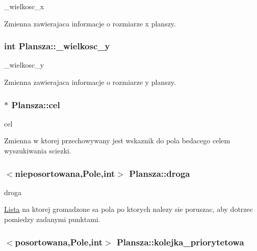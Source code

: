 \+\_\+wielkosc\+\_\+x 

Zmienna zawierajaca informacje o rozmiarze x planszy. \hypertarget{class_plansza_a8f896782ff5b9322070dc0fcc6f8efa0}{
\subsubsection[{\+\_\+wielkosc\+\_\+y}]{\setlength{\rightskip}{0pt plus 5cm}int Plansza\+::\+\_\+wielkosc\+\_\+y\hspace{0.3cm}{\ttfamily [private]}}}\label{class_plansza_a8f896782ff5b9322070dc0fcc6f8efa0}


\+\_\+wielkosc\+\_\+y 

Zmienna zawierajaca informacje o rozmiarze y planszy. \hypertarget{class_plansza_a1a2574ca93b7df2633c33194ca7bb0a7}{
\subsubsection[{cel}]{$\ast$ Plansza\+::cel}}\label{class_plansza_a1a2574ca93b7df2633c33194ca7bb0a7}


cel 

Zmienna w ktorej przechowywany jest wskaznik do pola bedacego celem wyszukiwania sciezki. \hypertarget{class_plansza_aec2526e5fde2763eb9f2447e0830c1cb}{
\subsubsection[{droga}]{$<$nieposortowana,{\bf Pole},int$>$ Plansza\+::droga\hspace{0.3cm}{\ttfamily [private]}}}\label{class_plansza_aec2526e5fde2763eb9f2447e0830c1cb}


droga 

\hyperlink{class_lista}{Lista} na ktorej gromadzone sa pola po ktorych nalezy sie poruszac, aby dotrzec pomiedzy zadanymi punktami. \hypertarget{class_plansza_abe25940912409371c0cdfbf3547b5626}{
\subsubsection[{kolejka\+\_\+priorytetowa}]{$<$posortowana,{\bf Pole},int$>$ Plansza\+::kolejka\+\_\+priorytetowa\hspace{0.3cm}{\ttfamily [private]}}}\label{class_plansza_abe25940912409371c0cdfbf3547b5626}


